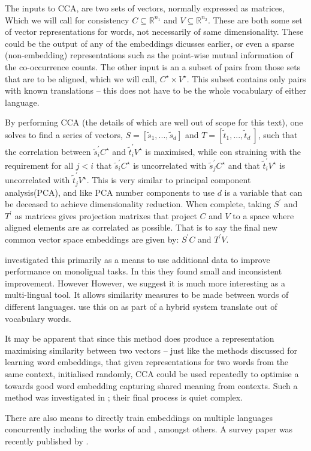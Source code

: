 \documentclass[parskip]{komatufte}
\begin{document}
The inputs to CCA, are two sets of vectors, normally expressed as matrices,
Which we will call for consistency $C \subseteq \mathbb{R}^{n_1}$ and $V \subseteq \mathbb{R}^{n_2}$.
These are both some set of vector representations for words, not necessarily of same dimensionality.
These could be the output of any of the embeddings dicusses earlier,
or even a sparse (non-embedding) representations such as the point-wise mutual information of the co-occurrence counts.
The other input is an a subset of pairs from those sets that are to be aligned, which we will call, $C^\star \times V^\star$.
This subset contains only pairs with known translations -- this does not have to be the whole vocabulary of either language.


%
By performing CCA (the details of which are well out of scope for this text),
one solves to find a series of vectors, $S=\left[ \tilde{s}_1, ..., \tilde{s}_d \right]$ and $T= \left[ \tilde{t}_1, ..., \tilde{t}_d\ \right]$,
such that the correlation between $\tilde{s}_i^\prime C^\star$ and $\tilde{t}_i^\prime V^\star$ is maximised,
while con straining with the requirement for all $j<i$ that $\tilde{s}_i^\prime C^\star$ is uncorrelated with $\tilde{s}_j^\prime C^\star$  and that  $\tilde{t}_i^\prime V^\star$ is uncorrelated with $\tilde{t}_j^\prime V^\star$.
This is very similar to principal component analysis(PCA), and like PCA number components to use $d$ is a variable that can be deceased to achieve dimensionality reduction.
When complete, taking $S^\prime$ and $T^\prime$ as matrices gives projection matrixes that project $C$ and $V$ to a space where aligned elements are as correlated as possible.
That is to say the final new common vector space embeddings are given by:
$S^\prime C$ and $T^\prime V$.

\textcite{faruqui2014improving} investigated this primarily as a means to use additional data to improve performance on monoligual tasks.
In this they found small and inconsistent improvement.
However
However, we suggest it is much more interesting as a multi-lingual tool.
It allows similarity measures to be made between words of different languages.
 use this on as part of a hybrid system translate out of vocabulary words.



It may be apparent that since this method does produce a representation maximising similarity between two vectors -- just like the methods discussed for learning word embeddings,
that given representations for two words from the same context, initialised randomly,
CCA could be used repeatedly to optimise a towards good word embedding capturing shared meaning from contexts.
Such a method was investigated in ; their final process is quiet complex.


There are also means to directly train embeddings on multiple languages concurrently including the works of  and , amongst others.
A survey paper was recently published by \textcite{Ruder17crosslingreview}.


\end{document}

